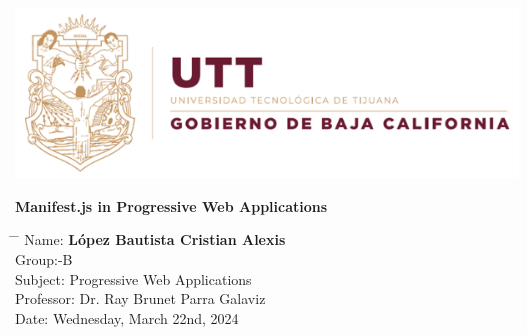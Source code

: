 \documentclass[12pt,a4paper]{article}
\title{}
\author{}
\date{}
\begin{document}
	
	\newcommand{\subf}[2]{%
		{\small\begin{tabular}[t]{@{}c@{}}
				#1\\#2
		\end{tabular}}%
	}
	
	\begin{titlepage}
		\begin{center}
			
			\textbf{}
            \includegraphics[width=1\textwidth]{utt.png}

            \vspace*{3cm}

			\vspace{1.5cm}
			
			\Huge
			\textbf{Manifest.js in Progressive Web Applications}
			
			\vspace{0.8cm}
			\large
			
			\vspace{0.5cm}
			\LARGE
			
			
			\vfill
			
			
			
			\vspace{0.8cm}
			
			
			
			\Large
			
			
			
			
		\end{center}
		\Large
		\begin{tabbing}
			\hspace*{1em}\= \hspace*{8em} \= \kill %
			\> Name:\>  \textbf{López Bautista Cristian Alexis} \\
			\> Group:\>  10-B \\
			\> Subject:\>  Progressive Web Applications  \\
			\> Professor:  \> Dr. Ray Brunet Parra Galaviz \\
			\> Date: \>  Wednesday, March 22nd, 2024
		\end{tabbing}
		
	\end{titlepage}
\end{document}
